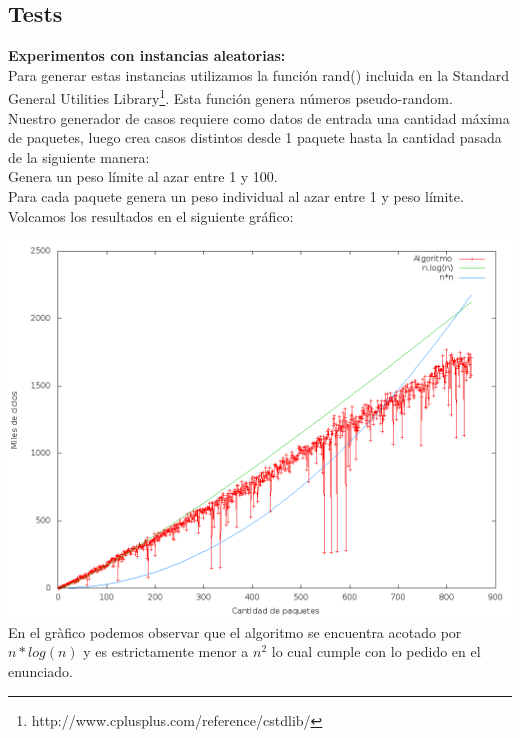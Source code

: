 \subsection{Tests}
\textbf{Experimentos con instancias aleatorias:}\\

Para generar estas instancias utilizamos la función rand() incluida en la Standard General Utilities Library\footnote{http://www.cplusplus.com/reference/cstdlib/}. Esta función genera números pseudo-random.\\

Nuestro generador de casos requiere como datos de entrada una cantidad máxima de paquetes, luego crea casos distintos desde 1 paquete hasta la cantidad pasada de la siguiente manera:\\
Genera un peso límite al azar entre 1 y 100.\\
Para cada paquete genera un peso individual al azar entre 1 y peso límite.\\

Volcamos los resultados en el siguiente gráfico:

\includegraphics[scale=0.35]{ej1/Graficos/850casos.png}\\

En el gràfico podemos observar que el algoritmo se encuentra acotado por $n*log(n)$ y es estrictamente menor a $n^2$ lo cual cumple con lo pedido en el enunciado.

